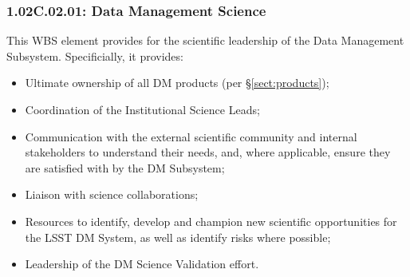 \subsubsection*{1.02C.02.01: Data Management Science}

This WBS element provides for the scientific leadership of the Data Management
Subsystem. Specificially, it provides:

\begin{itemize}

  \item{Ultimate ownership of all DM products (per \S\ref{sect:products});}

  \item{Coordination of the Institutional Science Leads;}

  \item{Communication with the external scientific community and internal
  stakeholders to understand their needs, and, where applicable, ensure they
  are satisfied with by the DM Subsystem;}

  \item{Liaison with science collaborations;}

  \item{Resources to identify, develop and champion new scientific
  opportunities for the LSST DM System, as well as identify risks where
  possible;}

  \item{Leadership of the DM Science Validation effort.}

\end{itemize}
